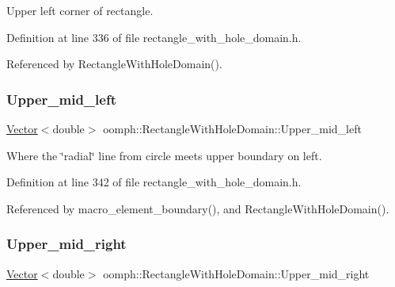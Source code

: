 Upper left corner of rectangle. 



Definition at line 336 of file rectangle\+\_\+with\+\_\+hole\+\_\+domain.\+h.



Referenced by Rectangle\+With\+Hole\+Domain().

\mbox{\label{classoomph_1_1RectangleWithHoleDomain_a025fb05e2f6905e62459ecd45ed389e2}} 
\subsubsection{\texorpdfstring{Upper\+\_\+mid\+\_\+left}{Upper\_mid\_left}}
{\footnotesize\ttfamily \hyperlink{classoomph_1_1Vector}{Vector}$<$double$>$ oomph\+::\+Rectangle\+With\+Hole\+Domain\+::\+Upper\+\_\+mid\+\_\+left\hspace{0.3cm}{\ttfamily [private]}}



Where the \char`\"{}radial\char`\"{} line from circle meets upper boundary on left. 



Definition at line 342 of file rectangle\+\_\+with\+\_\+hole\+\_\+domain.\+h.



Referenced by macro\+\_\+element\+\_\+boundary(), and Rectangle\+With\+Hole\+Domain().

\mbox{\label{classoomph_1_1RectangleWithHoleDomain_aa38db31456f7dd847e13d03d96fc99aa}} 
\subsubsection{\texorpdfstring{Upper\+\_\+mid\+\_\+right}{Upper\_mid\_right}}
{\footnotesize\ttfamily \hyperlink{classoomph_1_1Vector}{Vector}$<$double$>$ oomph\+::\+Rectangle\+With\+Hole\+Domain\+::\+Upper\+\_\+mid\+\_\+right\hspace{0.3cm}{\ttfamily [private]}}



